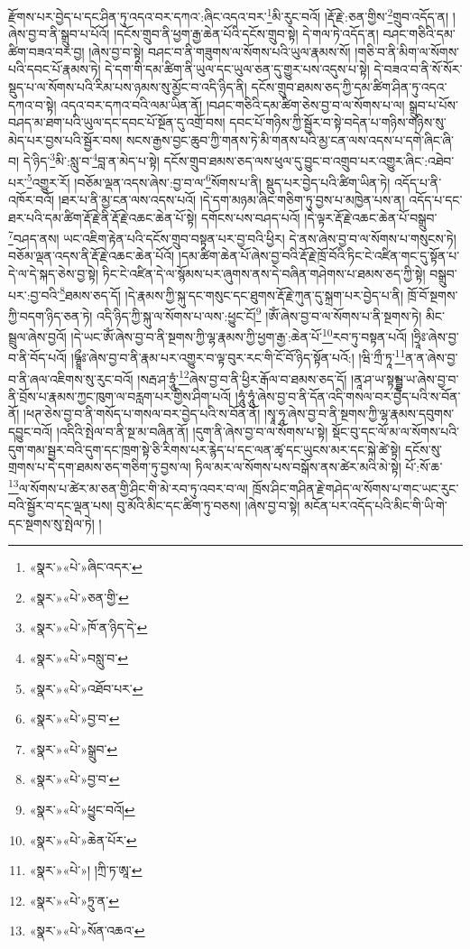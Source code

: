 རྫོགས་པར་བྱེད་པ་དང་ཤིན་ཏུ་འདའ་བར་དཀའ་:ཞིང་འདའ་བར་\footnote{«སྣར་»«པེ་»ཞིང་འདར་}མི་རུང་བའོ། །རྡོ་རྗེ་:ཅན་གྱིས་\footnote{«སྣར་»«པེ་»ཅན་གྱི་}གྲུབ་འདོད་ན། །ཞེས་བྱ་བ་ནི་སྒྲུབ་པ་པོའོ། །དངོས་གྲུབ་ནི་ཕྱག་རྒྱ་ཆེན་པོའི་དངོས་གྲུབ་སྟེ། དེ་གལ་ཏེ་འདོད་ན། བཤང་གཅིའི་དམ་ཚིག་བཟའ་བར་བྱ། །ཞེས་བྱ་བ་སྟེ། བཤང་བ་ནི་གཟུགས་ལ་སོགས་པའི་ཡུལ་རྣམས་སོ། །གཅི་བ་ནི་མིག་ལ་སོགས་པའི་དབང་པོ་རྣམས་ཏེ། དེ་དག་གི་དམ་ཚིག་ནི་ཡུལ་དང་ཡུལ་ཅན་དུ་གྱུར་པས་འདུས་པ་སྟེ། དེ་བཟའ་བ་ནི་སོ་སོར་སྡུད་པ་ལ་སོགས་པའི་རིམ་པས་ཉམས་སུ་མྱོང་བ་འདི་ཉིད་ནི། དངོས་གྲུབ་ཐམས་ཅད་ཀྱི་དམ་ཚིག་ཤིན་ཏུ་འདའ་དཀའ་བ་སྟེ། འདའ་བར་དཀའ་བའི་ལམ་ཡིན་ནོ། །བཤང་གཅིའི་དམ་ཚིག་ཅེས་བྱ་བ་ལ་སོགས་པ་ལ། སྒྲུབ་པ་པོས་བཤད་མ་ཐག་པའི་ཡུལ་དང་དབང་པོ་སྔོན་དུ་འགྲོ་བས། དབང་པོ་གཉིས་ཀྱི་སྦྱོར་བ་སྟེ་བདེན་པ་གཉིས་གཉིས་སུ་མེད་པར་བྱས་པའི་སྦྱོར་བས། སངས་རྒྱས་བྱང་ཆུབ་ཀྱི་གནས་ཏེ་མི་གནས་པའི་མྱ་ངན་ལས་འདས་པ་དགེ་ཞིང་ཞི་བ། དེ་ཉིད་\footnote{«སྣར་»«པེ་»ཁོ་ན་ཉིད་དེ་}མི་:སླུ་བ་\footnote{«སྣར་»«པེ་»བསླུ་བ་}བླ་ན་མེད་པ་སྟེ། དངོས་གྲུབ་ཐམས་ཅད་ལས་ཕུལ་དུ་བྱུང་བ་འགྲུབ་པར་འགྱུར་ཞིང་:འཐེབ་པར་\footnote{«སྣར་»«པེ་»འཐོབ་པར་}འགྱུར་རོ། །བཅོམ་ལྡན་འདས་ཞེས་:བྱ་བ་ལ་\footnote{«སྣར་»«པེ་»བྱ་བ་}སོགས་པ་ནི། སྡུད་པར་བྱེད་པའི་ཚིག་ཡིན་ཏེ། འདོད་པ་ནི་འཁོར་བའོ། །ཐར་པ་ནི་མྱ་ངན་ལས་འདས་པའོ། །དེ་དག་མཉམ་ཞིང་གཅིག་ཏུ་བྱས་པ་མཁྱེན་པས་ན། འདོད་པ་དང་ཐར་པའི་དམ་ཚིག་རྡོ་རྗེ་ནི་རྡོ་རྗེ་འཆང་ཆེན་པོ་སྟེ། དགོངས་པས་བཤད་པའོ། །དེ་ལྟར་རྡོ་རྗེ་འཆང་ཆེན་པོ་བསྒྲུབ་\footnote{«སྣར་»«པེ་»སྒྲུབ་}བཤད་ནས། ཡང་འཇིག་རྟེན་པའི་དངོས་གྲུབ་བསྟན་པར་བྱ་བའི་ཕྱིར། དེ་ནས་ཞེས་བྱ་བ་ལ་སོགས་པ་གསུངས་ཏེ། བཅོམ་ལྡན་འདས་ནི་རྡོ་རྗེ་འཆང་ཆེན་པོའོ། །དམ་ཚིག་ཆེན་པོ་ཞེས་བྱ་བའི་རྡོ་རྗེ་ཁྲོ་བོའི་ཏིང་ངེ་འཛིན་གང་དུ་སྟོན་པ་དེ་ལ་དེ་སྐད་ཅེས་བྱ་སྟེ། ཏིང་ངེ་འཛིན་དེ་ལ་སྙོམས་པར་ཞུགས་ནས་དེ་བཞིན་གཤེགས་པ་ཐམས་ཅད་ཀྱི་སྟེ། བསྒྲུབ་པར་:བྱ་བའི་\footnote{«སྣར་»«པེ་»བྱ་བ་}ཐམས་ཅད་དོ། །དེ་རྣམས་ཀྱི་སྐུ་དང་གསུང་དང་ཐུགས་རྡོ་རྗེ་ཀུན་དུ་སྐྲག་པར་བྱེད་པ་ནི། ཁྲོ་བོ་སྔགས་ཀྱི་བདག་ཉིད་ཅན་ཏེ། འདི་ཉིད་ཀྱི་སྐུ་ལ་སོགས་པ་ལས་:ཕྱུང་ངོ།\footnote{«སྣར་»«པེ་»ཕྱུང་བའོ།} །ཨོཾ་ཞེས་བྱ་བ་ལ་སོགས་པ་ནི་སྔགས་ཏེ། མིང་སྦྲུལ་ཞེས་བྱའོ། །དེ་ཡང་ཨོཾ་ཞེས་བྱ་བ་ནི་སྔགས་ཀྱི་ལྷ་རྣམས་ཀྱི་ཕྱག་རྒྱ་:ཆེན་པོ་\footnote{«སྣར་»«པེ་»ཆེན་པོར་}རབ་ཏུ་བསྟན་པའོ། །ཧྲཱིཿ་ཞེས་བྱ་བ་ནི་བོད་པའོ། །ཥྚྲཱྀཿ་ཞེས་བྱ་བ་ནི་རྣམ་པར་འགྱུར་བ་ལྟ་བུར་རང་གི་ངོ་བོ་ཉིད་སྟོན་པའོ:། །ཝི་ཀྲྀ་ཏཱ་\footnote{«སྣར་»«པེ་»། །ཀྲི་ཏ་ཨཱ་}ན་ན་ཞེས་བྱ་བ་ནི་ཞལ་འཇིགས་སུ་རུང་བའོ། །སརྦ་ཤ་ཏྲཱུཾ་\footnote{«སྣར་»«པེ་»ཏྲུ་ན་}ཞེས་བྱ་བ་ནི་ཕྱིར་རྒོལ་བ་ཐམས་ཅད་དོ། །ནཱ་ཤ་ཡ་སྟམྦྷ་ཡ་ཞེས་བྱ་བ་ནི་བྲོས་པ་རྣམས་ཀྱང་ཁུག་ལ་བརླག་པར་གྱིས་ཤིག་པའོ། །ཧཱུཾ་ཧཱུཾ་ཞེས་བྱ་བ་ནི་དོན་འདི་གསལ་བར་བྱེད་པའི་ས་བོན་ནོ། །ཕཊ་ཅེས་བྱ་བ་ནི་གསོད་པ་གསལ་བར་བྱེད་པའི་ས་བོན་ནོ། །སྭཱ་ཧཱ་ཞེས་བྱ་བ་ནི་སྔགས་ཀྱི་ལྷ་རྣམས་དབུགས་དབྱུང་བའོ། །འདིའི་སྤེལ་བ་ནི་སྔ་མ་བཞིན་ནོ། །དུག་ནི་ཞེས་བྱ་བ་ལ་སོགས་པ་སྟེ། སྡོང་བུ་དང་ལོ་མ་ལ་སོགས་པའི་དུག་གམ་སྦྱར་བའི་དུག་དང་ཁྲག་སྟེ་ཅི་རིགས་པར་རྙེད་པ་དང་ལན་ཚྭ་དང་ཡུངས་མར་དང་སྐེ་ཚེ་སྟེ། དངོས་སུ་གྲགས་པ་དེ་དག་ཐམས་ཅད་གཅིག་ཏུ་བྱས་ལ། ཏིལ་མར་ལ་སོགས་པས་བསྒོས་ནས་ཚེར་མའི་མེ་སྟེ། པོ་:སོ་ཆ་\footnote{«སྣར་»«པེ་»སོན་འཆའ་}ལ་སོགས་པ་ཚེར་མ་ཅན་གྱི་ཤིང་གི་མེ་རབ་ཏུ་འབར་བ་ལ། ཁྲོས་ཤིང་གཤིན་རྗེ་གཤེད་ལ་སོགས་པ་གང་ཡང་རུང་བའི་སྦྱོར་བ་དང་ལྡན་པས། བུ་མོའི་མིང་དང་ཚིག་ཏུ་བཅས། །ཞེས་བྱ་བ་སྟེ། མངོན་པར་འདོད་པའི་མིང་གི་ཡི་གེ་དང་སྔགས་སུ་སྤེལ་ཏེ། །
